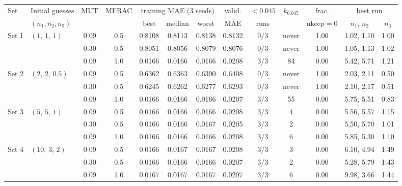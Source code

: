 \begin{tabular}{@{}l l c c c c c c c c c c c@{}}
\toprule
Set & Initial guesses & MUT & MFRAC & \multicolumn{3}{c}{training MAE (3 seeds)} & valid. & $<0.045$ & $k_{0.045}$ & frac. & \multicolumn{2}{c}{best run}\\
\cmidrule(lr){5-7}\cmidrule(l){12-13}
 & $(n_1,n_2,n_3)$ & & & best & median & worst & MAE & runs & & nkeep$=0$ & $n_1$, $n_2$ & $n_3$\\
\midrule
Set 1 & $(1,\,1,\,1)$ & 0.09 & 0.5 & 0.8108 & 0.8113 & 0.8138 & 0.8132 & \color{bad}0/3 & never & 1.00 & 1.02, 1.10 & 1.00\\
 &  & 0.30 & 0.5 & 0.8051 & 0.8056 & 0.8079 & 0.8076 & \color{bad}0/3 & never & 1.00 & 1.05, 1.13 & 1.02\\
 &  & 0.09 & 1.0 & 0.0166 & 0.0166 & 0.0166 & 0.0208 & 3/3 & 84 & 0.00 & 5.42, 5.71 & 1.21\\
\midrule
Set 2 & $(2,\,2,\,0.5)$ & 0.09 & 0.5 & 0.6362 & 0.6363 & 0.6390 & 0.6408 & \color{bad}0/3 & never & 1.00 & 2.03, 2.11 & 0.50\\
 &  & 0.30 & 0.5 & 0.6245 & 0.6262 & 0.6277 & 0.6293 & \color{bad}0/3 & never & 1.00 & 2.10, 2.17 & 0.51\\
 &  & 0.09 & 1.0 & 0.0166 & 0.0166 & 0.0166 & 0.0207 & 3/3 & 55 & 0.00 & 5.75, 5.51 & 0.83\\
\midrule
Set 3 & $(5,\,5,\,1)$ & 0.09 & 0.5 & 0.0166 & 0.0166 & 0.0166 & 0.0208 & 3/3 & 4 & 0.00 & 5.56, 5.57 & 1.15\\
 &  & 0.30 & 0.5 & 0.0166 & 0.0166 & 0.0167 & 0.0205 & 3/3 & 2 & 0.00 & 5.50, 5.70 & 1.01\\
 &  & 0.09 & 1.0 & 0.0166 & 0.0166 & 0.0166 & 0.0208 & 3/3 & 6 & 0.00 & 5.85, 5.30 & 1.10\\
\midrule
Set 4 & $(10,\,3,\,2)$ & 0.09 & 0.5 & 0.0166 & 0.0167 & 0.0167 & 0.0208 & 3/3 & 3 & 0.00 & 6.10, 4.94 & 1.49\\
 &  & 0.30 & 0.5 & 0.0166 & 0.0166 & 0.0166 & 0.0207 & 3/3 & 2 & 0.00 & 5.28, 5.79 & 1.43\\
 &  & 0.09 & 1.0 & 0.0167 & 0.0167 & 0.0167 & 0.0207 & 3/3 & 6 & 0.00 & 9.98, 3.66 & 1.44\\
\bottomrule
\end{tabular}
